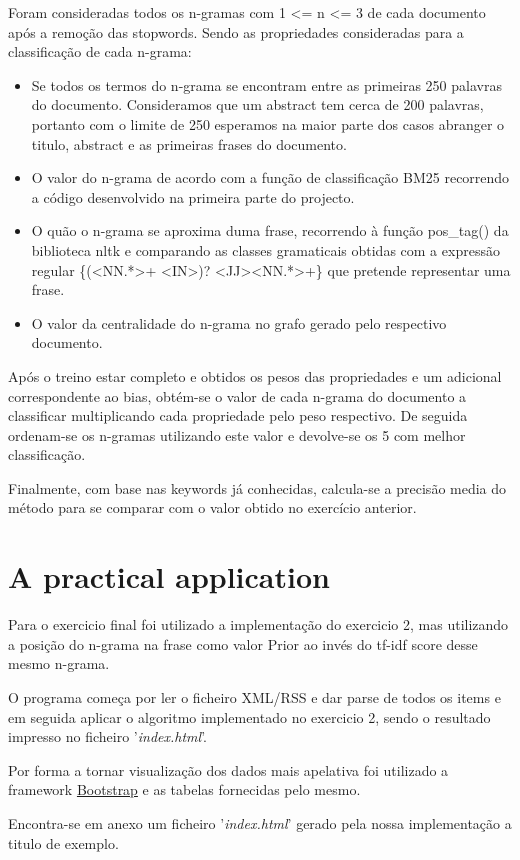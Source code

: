 \documentclass[a4paper,titlepage,11pt]{article}
\begin{document}
Foram consideradas todos os n-gramas com 1 \textless= n \textless= 3 de cada documento após a remoção das stopwords.
Sendo as propriedades consideradas para a classificação de cada n-grama:

\begin{itemize}
  \item Se todos os termos do n-grama se encontram entre as primeiras 250 palavras do documento.
  Consideramos que um abstract tem cerca de 200 palavras, portanto com o limite de 250 esperamos na
  maior parte dos casos abranger o titulo, abstract e as primeiras frases do documento.
  \item O valor do n-grama de acordo com a função de classificação BM25 recorrendo a código desenvolvido
  na primeira parte do projecto.
  \item O quão o n-grama se aproxima duma frase, recorrendo à função pos\_tag() da biblioteca nltk e comparando
  as classes gramaticais obtidas com a expressão regular
  \{(\textless{NN}.*\textgreater+ \textless{IN}\textgreater)? \textless{JJ}\textgreater* \textless{NN}.*\textgreater+\}
  que pretende representar uma frase.
  \item O valor da centralidade do n-grama no grafo gerado pelo respectivo documento.
\end{itemize}

Após o treino estar completo e obtidos os pesos das propriedades e um adicional correspondente ao bias,
obtém-se o valor de cada n-grama do documento a classificar multiplicando cada propriedade pelo peso
respectivo. De seguida ordenam-se os n-gramas utilizando este valor e devolve-se os 5 com melhor classificação.

Finalmente, com base nas keywords já conhecidas, calcula-se a precisão media do método para se comparar
com o valor obtido no exercício anterior.

\section{A practical application}
Para o exercicio final foi utilizado a implementação do exercicio 2, mas utilizando a posição do n-grama na frase
como valor Prior ao invés do tf-idf score desse mesmo n-grama.

O programa começa por ler o ficheiro XML/RSS e dar parse de todos os items e em seguida aplicar o algoritmo implementado
no exercicio 2, sendo o resultado impresso no ficheiro '\textit{index.html}'.

Por forma a tornar visualização dos dados mais apelativa foi utilizado a framework \href{http://getbootstrap.com/}{Bootstrap}
e as tabelas fornecidas pelo mesmo.

Encontra-se em anexo um ficheiro '\textit{index.html}' gerado pela nossa implementação a titulo de exemplo.
\end{document}

